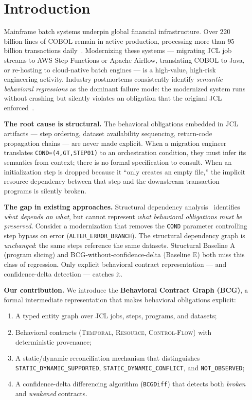 \documentclass[sigconf,anonymous,review]{acmart}
\newcommand{\bcg}{\textsc{BCG}\xspace}
\newcommand{\notobs}{\texttt{NOT\_OBSERVED}\xspace}
\newcommand{\supported}{\texttt{STATIC\_DYNAMIC\_SUPPORTED}\xspace}
\newcommand{\conflict}{\texttt{STATIC\_DYNAMIC\_CONFLICT}\xspace}
\begin{document}
\section{Introduction}\label{sec:intro}

Mainframe batch systems underpin global financial infrastructure.
Over 220 billion lines of COBOL remain in active production, processing more than
95 billion transactions daily~\cite{comella2000survey}.
Modernizing these systems --- migrating JCL job streams to AWS Step Functions or
Apache Airflow, translating COBOL to Java, or re-hosting to cloud-native batch
engines --- is a high-value, high-risk engineering activity.
Industry postmortems consistently identify \emph{semantic behavioral regressions} as
the dominant failure mode: the modernized system runs without crashing but silently
violates an obligation that the original JCL enforced~\cite{ulrich2010information}.

\textbf{The root cause is structural.}
The behavioral obligations embedded in JCL artifacts --- step ordering, dataset
availability sequencing, return-code propagation chains --- are never made explicit.
When a migration engineer translates \texttt{COND=(4,GT,STEP01)} to an orchestration
condition, they must infer its semantics from context; there is no formal
specification to consult.
When an initialization step is dropped because it ``only creates an empty file,''
the implicit resource dependency between that step and the downstream transaction
programs is silently broken.

\textbf{The gap in existing approaches.}
Structural dependency analysis~\cite{tip1995slicing,reps1997profiling} identifies
\emph{what depends on what}, but cannot represent \emph{what behavioral obligations
must be preserved}.
Consider a modernization that removes the \texttt{COND} parameter controlling
step bypass on error (\texttt{ALTER\_ERROR\_BRANCH}).
The structural dependency graph is \emph{unchanged}: the same steps reference the
same datasets.
Structural Baseline A (program slicing) and BCG-without-confidence-delta
(Baseline E) both miss this class of regression.
Only explicit behavioral contract representation --- and confidence-delta detection
--- catches it.

\textbf{Our contribution.}
We introduce the \textbf{Behavioral Contract Graph (\bcg)}, a formal intermediate
representation that makes behavioral obligations explicit:
\begin{enumerate}
\item A typed entity graph over JCL jobs, steps, programs, and datasets;
\item Behavioral contracts (\textsc{Temporal}, \textsc{Resource},
      \textsc{Control-Flow}) with deterministic provenance;
\item A static/dynamic reconciliation mechanism that distinguishes
      \supported, \conflict, and \notobs;
\item A confidence-delta differencing algorithm (\texttt{BCGDiff}) that detects both
      \emph{broken} and \emph{weakened} contracts.
\end{enumerate}
\end{document}
